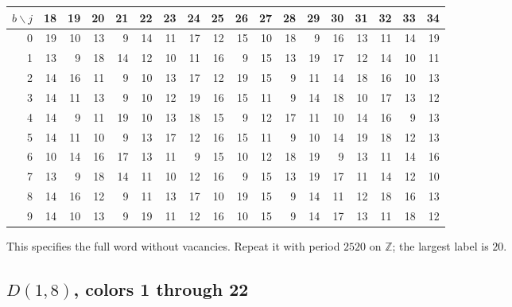 \documentclass[11pt,reqno]{amsart}
\theoremstyle{plain}
\newcommand{\D}[1]{D(1,#1)}
\theoremstyle{plain}
\theoremstyle{plain}
\begin{document}
\begin{center}\small
\begin{tabular}{r|rrrrrrrrrrrrrrrrr}
\toprule
$b\backslash j$ & 18 & 19 & 20 & 21 & 22 & 23 & 24 & 25 & 26 & 27 & 28 & 29 & 30 & 31 & 32 & 33 & 34 \\
\midrule
0 & 19 & 10 & 13 & 9 & 14 & 11 & 17 & 12 & 15 & 10 & 18 & 9 & 16 & 13 & 11 & 14 & 19 \\
1 & 13 & 9 & 18 & 14 & 12 & 10 & 11 & 16 & 9 & 15 & 13 & 19 & 17 & 12 & 14 & 10 & 11 \\
2 & 14 & 16 & 11 & 9 & 10 & 13 & 17 & 12 & 19 & 15 & 9 & 11 & 14 & 18 & 16 & 10 & 13 \\
3 & 14 & 11 & 13 & 9 & 10 & 12 & 19 & 16 & 15 & 11 & 9 & 14 & 18 & 10 & 17 & 13 & 12 \\
4 & 14 & 9 & 11 & 19 & 10 & 13 & 18 & 15 & 9 & 12 & 17 & 11 & 10 & 14 & 16 & 9 & 13 \\
5 & 14 & 11 & 10 & 9 & 13 & 17 & 12 & 16 & 15 & 11 & 9 & 10 & 14 & 19 & 18 & 12 & 13 \\
6 & 10 & 14 & 16 & 17 & 13 & 11 & 9 & 15 & 10 & 12 & 18 & 19 & 9 & 13 & 11 & 14 & 16 \\
7 & 13 & 9 & 18 & 14 & 11 & 10 & 12 & 16 & 9 & 15 & 13 & 19 & 17 & 11 & 14 & 12 & 10 \\
8 & 14 & 16 & 12 & 9 & 11 & 13 & 17 & 10 & 19 & 15 & 9 & 14 & 11 & 12 & 18 & 16 & 13 \\
9 & 14 & 10 & 13 & 9 & 19 & 11 & 12 & 16 & 10 & 15 & 9 & 14 & 17 & 13 & 11 & 18 & 12 \\
\bottomrule
\end{tabular}
\end{center}
This specifies the full word without vacancies. Repeat it with period
$2520$ on $\mathbb Z$; the largest label is $20$.


\clearpage
\subsection*{\texorpdfstring{$\D{8}$}{D(1,8)}, colors 1 through 22}
\end{document}
